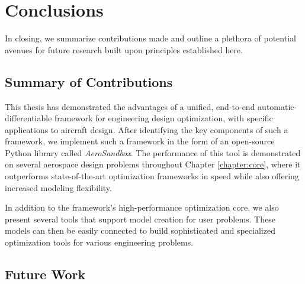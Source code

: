 \chapter{Conclusions}

In closing, we summarize contributions made and outline a plethora of potential avenues for future research built upon principles established here.


\section{Summary of Contributions}

This thesis has demonstrated the advantages of a unified, end-to-end automatic-differentiable framework for engineering design optimization, with specific applications to aircraft design. After identifying the key components of such a framework, we implement such a framework in the form of an open-source Python library called \textit{AeroSandbox}. The performance of this tool is demonstrated on several aerospace design problems throughout Chapter \ref{chapter:core}, where it outperforms state-of-the-art optimization frameworks in speed while also offering increased modeling flexibility.

In addition to the framework's high-performance optimization core, we also present several tools that support model creation for user problems. These models can then be easily connected to build sophisticated and specialized optimization tools for various engineering problems.

%
%
%


\section{Future Work}

